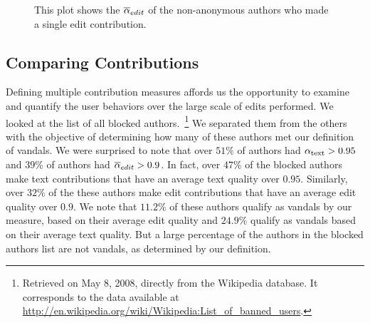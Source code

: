 \begin{figure}[tbph]
    \begin{center}
    \end{center}
    \caption[Edit quality of authors with one edit]{
        This plot shows the ${\overline{\alpha}}_{edit}$ of the
	non-anonymous authors who made a single edit contribution.
    }
    \label{fig-singles-quality}
\end{figure}






\subsection{Comparing Contributions}

Defining multiple contribution measures affords us
the opportunity to examine and quantify the
user behaviors over the large scale of edits performed.
We looked at the list of all blocked authors.~\footnote{Retrieved
on May 8, 2008, directly from the Wikipedia database.
It corresponds to the data available at
\url{http://en.wikipedia.org/wiki/Wikipedia:List_of_banned_users}.}
We separated them from the others with the objective of determining 
how many of these authors met our definition of vandals.
We were surprised to note that over $51\%$ of authors had 
$\alpha_\text{text} > 0.95$ and $39\%$ of authors had 
${\overline{\alpha}}_{edit} > 0.9$.
In fact, over $47\%$ of the blocked authors make text contributions 
that have an average text quality over $0.95$.
Similarly, over $32\%$ of the these authors make edit contributions
that have an average edit quality over $0.9$.
We note that $11.2\%$ of these authors qualify as vandals by our measure,
based on their average edit quality and $24.9\%$ qualify as vandals
based on their average text quality.
But a large percentage of the authors in the blocked authors 
list are not vandals, as determined by our definition.

